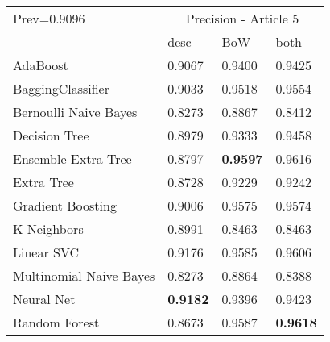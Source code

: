 \begin{tabular}{|l|l|l|l| }
\hline
Prev=0.9096 &  \multicolumn{3}{c|}{Precision - Article 5} \\
\cline{2-4} & desc & BoW & both \\ \hline
AdaBoost                & 0.9067 & 0.9400 & 0.9425\\
BaggingClassifier       & 0.9033 & 0.9518 & 0.9554\\
Bernoulli Naive Bayes   & 0.8273 & 0.8867 & 0.8412\\
Decision Tree           & 0.8979 & 0.9333 & 0.9458\\
Ensemble Extra Tree     & 0.8797 & {\bf 0.9597} & 0.9616\\
Extra Tree              & 0.8728 & 0.9229 & 0.9242\\
Gradient Boosting       & 0.9006 & 0.9575 & 0.9574\\
K-Neighbors             & 0.8991 & 0.8463 & 0.8463\\
Linear SVC              & 0.9176 & 0.9585 & 0.9606\\
Multinomial Naive Bayes & 0.8273 & 0.8864 & 0.8388\\
Neural Net              & {\bf 0.9182} & 0.9396 & 0.9423\\
Random Forest           & 0.8673 & 0.9587 & {\bf 0.9618}\\
\hline
\end{tabular}
